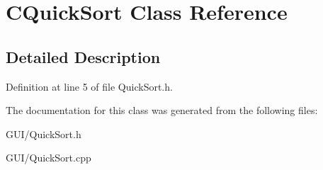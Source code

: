 \hypertarget{class_c_quick_sort}{}\section{C\+Quick\+Sort Class Reference}
\label{class_c_quick_sort}


\subsection{Detailed Description}


Definition at line 5 of file Quick\+Sort.\+h.



The documentation for this class was generated from the following files\+:\begin{DoxyCompactItemize}
\item 
G\+U\+I/Quick\+Sort.\+h\item 
G\+U\+I/Quick\+Sort.\+cpp\end{DoxyCompactItemize}

